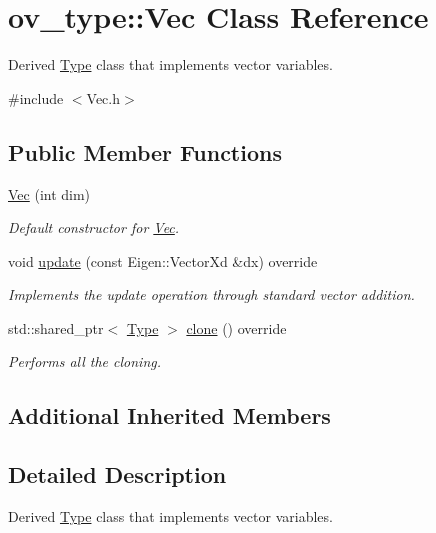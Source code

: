 \hypertarget{classov__type_1_1Vec}{}\section{ov\+\_\+type\+:\+:Vec Class Reference}
\label{classov__type_1_1Vec}


Derived \hyperlink{classov__type_1_1Type}{Type} class that implements vector variables.  




{\ttfamily \#include $<$Vec.\+h$>$}

\subsection*{Public Member Functions}
\begin{DoxyCompactItemize}
\item 
\hyperlink{classov__type_1_1Vec_aae80ad8a2e9580f20ee90e126f36bcb0}{Vec} (int dim)
\begin{DoxyCompactList}\small\item\em Default constructor for \hyperlink{classov__type_1_1Vec}{Vec}. \end{DoxyCompactList}\item 
void \hyperlink{classov__type_1_1Vec_a7d66e9414946807c9469de0a1038256d}{update} (const Eigen\+::\+Vector\+Xd \&dx) override
\begin{DoxyCompactList}\small\item\em Implements the update operation through standard vector addition. \end{DoxyCompactList}\item 
\mbox{\label{classov__type_1_1Vec_a31a73978bc3c8dc0f0df1a1abc83664f}} 
std\+::shared\+\_\+ptr$<$ \hyperlink{classov__type_1_1Type}{Type} $>$ \hyperlink{classov__type_1_1Vec_a31a73978bc3c8dc0f0df1a1abc83664f}{clone} () override
\begin{DoxyCompactList}\small\item\em Performs all the cloning. \end{DoxyCompactList}\end{DoxyCompactItemize}
\subsection*{Additional Inherited Members}


\subsection{Detailed Description}
Derived \hyperlink{classov__type_1_1Type}{Type} class that implements vector variables. 

